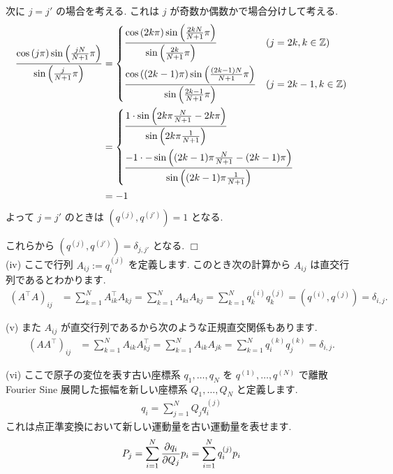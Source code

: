 \documentclass[a4paper,dvipdfmx]{jsarticle}
\theoremstyle{definition}
\newcommand{\ZZ}{\mathbb{Z}}
\begin{document}
次に $j = j'$ の場合を考える. これは $j$ が奇数か偶数かで場合分けして考える.
\begin{align}
  \frac{\cos\qty(j\pi)\sin\qty(\frac{jN}{N+1}\pi)}{\sin\qty(\frac{j}{N+1}\pi)} & =
  \begin{dcases}
    \frac{\cos\qty(2k\pi)\sin\qty(\frac{2kN}{N+1}\pi)}{\sin\qty(\frac{2k}{N+1}\pi)}           & (j = 2k, k\in\ZZ)   \\
    \frac{\cos\qty((2k-1)\pi)\sin\qty(\frac{(2k-1)N}{N+1}\pi)}{\sin\qty(\frac{2k-1}{N+1}\pi)} & (j = 2k-1, k\in\ZZ)
  \end{dcases} \\ & =
  \begin{dcases}
    \frac{1\cdot\sin\qty(2k\pi\frac{N}{N+1} - 2k\pi)}{\sin\qty(2k\pi\frac{1}{N+1})} \\
    \frac{-1 \cdot -\sin\qty((2k-1)\pi\frac{N}{N+1} - (2k-1)\pi)}{\sin\qty((2k-1)\pi\frac{1}{N+1})}
  \end{dcases}         \\
                                                                               & = -1
\end{align}
よって $j = j'$ のときは $(q^{(j)}, q^{(j')}) = 1$ となる.

これらから $(q^{(j)}, q^{(j')}) = \delta_{j,j'}$ となる. $\Box$ \\

(iv) ここで行列 $A_{ij} := q_i^{(j)}$ を定義します. このとき次の計算から $A_{ij}$ は直交行列であるとわかります.
\begin{align}
  (A^{\top}A)_{ij} & = \sum_{k=1}^{N}A_{ik}^\top A_{kj} = \sum_{k=1}^{N}A_{ki}A_{kj} = \sum_{k=1}^{N}q_k^{(i)}q_k^{(j)} = (q^{(i)}, q^{(j)}) = \delta_{i,j}.
\end{align}

(v) また $A_{ij}$ が直交行列であるから次のような正規直交関係もあります.
\begin{align}
  (AA^{\top})_{ij} & = \sum_{k=1}^{N}A_{ik}A_{kj}^{\top} = \sum_{k=1}^{N}A_{ik}A_{jk} = \sum_{k=1}^{N}q_i^{(k)}q_j^{(k)} = \delta_{i,j}.
\end{align}

(vi) ここで原子の変位を表す古い座標系 $q_1, \ldots, q_N$ を $q^{(1)}, \ldots, q^{(N)}$ で離散 Fourier Sine 展開した振幅を新しい座標系 $Q_1, \ldots, Q_N$ と定義します.
\begin{align}
  q_i = \sum_{j=1}^{N}Q_jq_i^{(j)}
\end{align}
これは点正準変換において新しい運動量を古い運動量を表せます.
\begin{align}
  P_j = \sum_{i=1}^{N}\pdv{q_i}{Q_j}p_i = \sum_{i=1}^{N}q_i^{(j)}p_i
\end{align}
\end{document}
